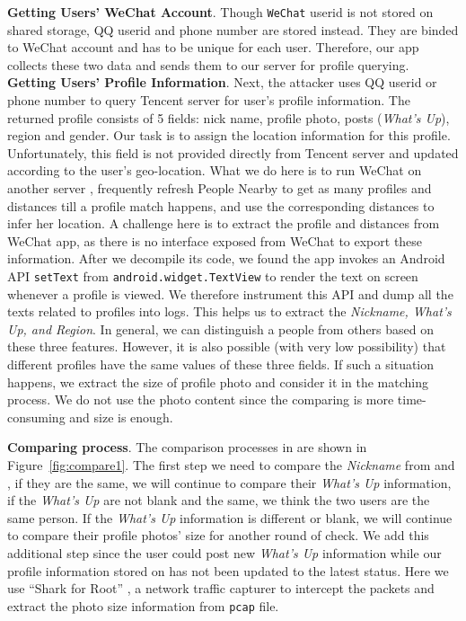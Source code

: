 \documentclass{sig-alternate}
\begin{document}
\vspace{2pt}\noindent\textbf{Getting Users' WeChat Account}.
Though \texttt{WeChat} userid is not stored on shared storage, QQ userid and phone number are stored instead. They are binded to WeChat account and has to be unique for each user. Therefore, our app collects these two data and sends them to our server  for profile querying.
\vspace{2pt}\noindent\textbf{Getting Users' Profile Information}.
Next, the attacker uses QQ userid or phone number to query Tencent server for user's profile information. The returned profile consists of 5 fields: nick name, profile photo, posts (\textit{What's Up}), region and gender. Our task is to assign the location information for this profile. Unfortunately, this field is not provided directly from Tencent server and updated according to the user's geo-location. What we do here is to run WeChat on another server , frequently refresh People Nearby to get as many profiles and distances till a profile match happens, and use the corresponding distances to infer her location. A challenge here is to extract the profile and distances from WeChat app, as there is no interface exposed from WeChat to export these information. After we decompile its code, we found the app invokes an Android API \texttt{setText} from \texttt{android.widget.TextView} to render the text on screen whenever a profile is viewed. We therefore instrument this API and dump all the texts related to profiles into logs. This helps us to extract the \textit{Nickname, What's Up, and Region}. In general, we can distinguish a people from others based on these three features. However, it is also possible (with very low possibility) that different profiles have the same values of these three fields. If such a situation happens, we extract the size of profile photo and consider it in the matching process. We do not use the photo content since the comparing is more time-consuming and size is enough.


\vspace{2pt}\noindent\textbf{Comparing process}.
The comparison processes in  are shown in Figure~\ref{fig:compare1}. The first step we need to compare the \textit{Nickname} from  and , if they are the same, we will continue to compare their \textit{What's Up} information, if the \textit{What's Up} are not blank and the same, we think the two users are the same person. If the \textit{What's Up} information is different or blank, we will continue to compare their profile photos' size for another round of check. We add this additional step since the user could post new \textit{What's Up} information while our profile information stored on  has not been updated to the latest status. Here we use ``Shark for Root'' \cite{wireshark}, a network traffic capturer to intercept the packets and extract the photo size information from \texttt{pcap} file.
\end{document}
